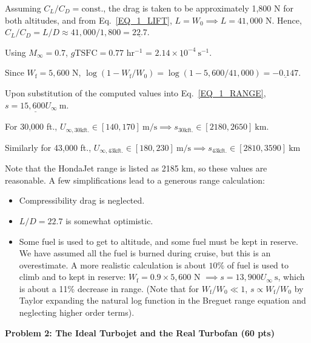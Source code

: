 \documentclass[12pt]{article}
\begin{document}
\begin{enumerate}[label=(\alph*)]
		Assuming $C_L/C_D=\mathrm{const.}$, the drag is taken to be approximately 1,800 N for both altitudes, and from Eq.~\ref{EQ_1_LIFT}, $L=W_0\implies L=41,000$ N. Hence, $C_L/C_D=L/D\approx 41,000/1,800=\underline{22.7}$.
		
		Using $M_\infty=0.7$, $g\mathrm{TSFC}=0.77$ hr$^{-1}$ = $\underline{2.14\times 10^{-4}\ \mathrm{s}^{-1}}$.
		
		Since $W_\mathrm{f}=5,600$ N, $\log\left(1-W_\mathrm{f}/W_0\right)=\log\left(1-5,600/41,000\right)=\underline{-0.147}$.
		
		Upon substitution of the computed values into Eq.~\ref{EQ_1_RANGE}, $\underline{s=15,600U_\infty\ \mathrm{m}}$.
		
		For 30,000 ft., $U_{\infty,30\mathrm{kft.}}\in[140,170]\ \mathrm{m/s}\implies \boxed{s_{30\mathrm{kft.}}\in[2180,2650]\ \mathrm{km}}$. 
		
		Similarly for 43,000 ft., $U_{\infty,43\mathrm{kft.}}\in[180,230]\ \mathrm{m/s}\implies \boxed{s_{43\mathrm{kft.}}\in[2810,3590]\ \mathrm{km}}$
		
		Note that the HondaJet range is listed as 2185 km, so these values are reasonable. A few simplifications lead to a generous range calculation:
		\begin{itemize}
			\item 
				Compressibility drag is neglected.
			\item 
				$L/D=22.7$ is somewhat optimistic.
			\item 
				Some fuel is used to get to altitude, and some fuel must be kept in reserve. We have assumed all the fuel is burned during cruise, but this is an overestimate. A more realistic calculation is about $10 \%$ of fuel is used to climb and to kept in reserve: $W_\mathrm{f}=0.9\times5,600$ N $\implies s=13,900U_\infty\ \mathrm{s}$, which is about a 11\% decrease in range. (Note that for $W_\mathrm{f}/W_0\ll 1$, $s\propto W_\mathrm{f}/W_0$ by Taylor expanding the natural log function in the Breguet range equation and neglecting higher order terms).
					 
		\end{itemize}
\end{enumerate}
\textbf{Problem 2: The Ideal Turbojet and the Real Turbofan (60 pts)}
\end{document}
